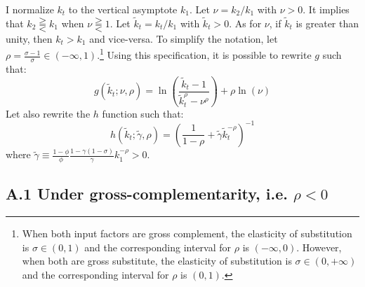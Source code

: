 I normalize $k_t$ to the vertical asymptote $k_1$. Let $\nu = k_2/k_1$ with $\nu > 0$. It implies that $k_2 \gtreqqless k_1$ when $\nu \gtreqqless 1$. Let $\tilde{k}_t = k_t / k_1$ with $\tilde{k}_t > 0$. As for $\nu$, if $\tilde{k}_t$ is greater than unity, then $k_t>k_1$ and vice-versa. To simplify the notation, let $\rho = \frac{\sigma-1}{\sigma} \in \left(-\infty, 1\right)$.\footnote{When both input factors are gross complement, the elasticity of substitution is $\sigma \in \left(0,1\right)$ and the corresponding interval for $\rho$ is $\left(-\infty, 0\right)$. However, when both are gross substitute, the elasticity of substitution is $\sigma \in \left(0,+\infty\right)$ and the corresponding interval for $\rho$ is $\left(0,1\right)$.} Using this specification, it is possible to rewrite $g$ such that:
\begin{equation*}
g(\tilde{k}_t; \nu, \rho) = \ln\left(\frac{\tilde{k}_t - 1}{\tilde{k}_t^\rho - \nu^\rho}\right) + \rho\ln\left(\nu\right)
\end{equation*}
Let also rewrite the $h$ function such that:
\begin{equation*}
h(\tilde{k}_t ; \tilde{\gamma}, \rho) = \left( \frac{1}{1-\rho} + \tilde{\gamma} \tilde{k}_t^{-\rho} \right)^{-1}
\end{equation*}
where $\tilde{\gamma} \equiv \frac{1-\phi}{\phi} \frac{1-\gamma(1-\sigma)}{\gamma} k_1^{-\rho}> 0$.

\subsection*{A.1 Under gross-complementarity, i.e. $\rho < 0$}

